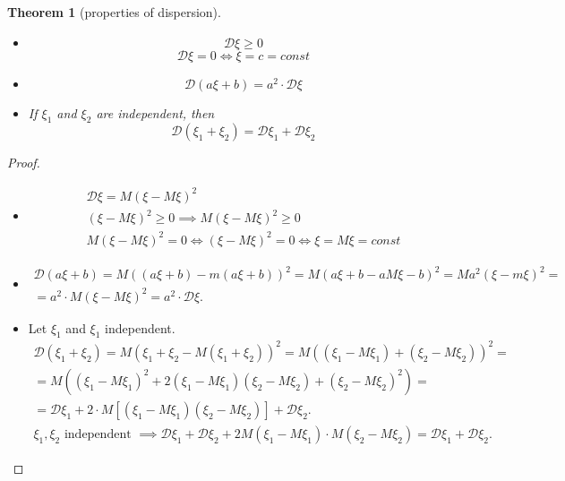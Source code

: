 \documentclass[12pt,letterpaper]{report}
\newtheorem{theorem}{Theorem}
\begin{document}
\begin{theorem}[properties of dispersion]
    \begin{itemize}
        \item[1.] \[ \mathcal{D}\xi \geq 0 \]
            \[ \mathcal{D}\xi = 0 \iff \xi = c = const \]
        \item[2.] \[ \mathcal{D}(a\xi + b) = a^2 \cdot \mathcal{D}\xi \]
        \item[3.] If $\xi_1$ and $\xi_2$ are independent, then 
            \[ \mathcal{D}(\xi_1 + \xi_2) = \mathcal{D}\xi_1 + \mathcal{D}\xi_2 \]
    \end{itemize}
\end{theorem}

\begin{proof}
    \begin{itemize}
        \item[1.]
        \begin{gather*}
                \mathcal{D}\xi = M(\xi - M\xi)^2 \\
                (\xi - M\xi)^2 \geq 0 \implies M(\xi -M\xi)^2 \geq 0 \\
                M(\xi-M\xi)^2 = 0 \iff (\xi-M\xi)^2 = 0 \iff \xi = M\xi = const
        \end{gather*}
    \item[2.] 
        \begin{gather*}
            \mathcal{D}(a\xi+b) = M((a\xi + b) - m(a\xi+b))^2 = M(a\xi + b - aM\xi -b)^2 = M a^2(\xi-m\xi)^2 = \\
            = a^2 \cdot M(\xi - M\xi)^2 = a^2 \cdot \mathcal{D}\xi.
        \end{gather*}
    \item[3.]
        Let $\xi_1$ and $\xi_1$ independent.
        \begin{gather*}
            \mathcal{D}(\xi_1 + \xi_2) = M(\xi_1 + \xi_2 - M(\xi_1 + \xi_2))^2 = 
            M((\xi_1 - M\xi_1) + (\xi_2 - M\xi_2))^2 = \\
            = M((\xi_1 -M\xi_1)^2 + 2(\xi_1-M\xi_1)(\xi_2-M\xi_2) + (\xi_2-M\xi_2)^2) = \\
            = \mathcal{D}\xi_1 + 2\cdot M[(\xi_1 -M\xi_1)(\xi_2-M\xi_2)] + \mathcal{D}\xi_2. \\
            \text{$\xi_1, \xi_2$ independent } \implies \mathcal{D}\xi_1 +
            \mathcal{D}\xi_2 + 2M(\xi_1-M\xi_1) \cdot M(\xi_2 -M\xi_2) = \mathcal{D}\xi_1 + \mathcal{D}\xi_2.
        \end{gather*}
    \end{itemize}
\end{proof}
\end{document}
